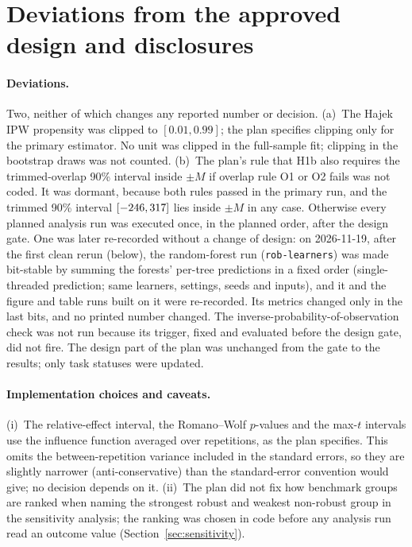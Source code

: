 \documentclass[11pt]{article}
\newcommand{\ci}[2]{$[#1, #2]$}
\begin{document}
\section{Deviations from the approved design and disclosures}
\label{sec:deviations}

\paragraph{Deviations.} Two, neither of which changes any reported number or decision.
(a)~The Hajek IPW propensity was clipped to $[0.01, 0.99]$; the plan specifies clipping only
for the primary estimator. No unit was clipped in the full-sample fit; clipping in the
bootstrap draws was not counted.
(b)~The plan's rule that H1b also requires the trimmed-overlap 90\% interval inside $\pm M$
if overlap rule O1 or O2 fails was not coded. It was dormant, because both rules passed in
the primary run, and the trimmed 90\% interval \ci{\TrimCINinetyLow}{\TrimCINinetyHigh} lies
inside $\pm M$ in any case.
Otherwise every planned analysis run was executed once, in the planned order, after the
design gate. One was later re-recorded without a change of design: on 2026-11-19, after the
first clean rerun (below), the random-forest run (\texttt{rob-learners}) was made bit-stable
by summing the forests' per-tree predictions in a fixed order (single-threaded prediction;
same learners, settings, seeds and inputs), and it and the figure and table runs built on it
were re-recorded. Its metrics changed only in the last bits, and no printed number changed. The inverse-probability-of-observation check
was not run because its trigger, fixed and evaluated before the design gate, did not fire.
The design part of the plan was unchanged from the gate to the results; only task statuses
were updated.

\paragraph{Implementation choices and caveats.} (i)~The relative-effect interval, the
Romano--Wolf $p$-values and the max-$t$ intervals use the influence function averaged over
repetitions, as the plan specifies. This omits the between-repetition variance included in
the standard errors, so they are slightly narrower (anti-conservative) than the
standard-error convention would give; no decision depends on it.
(ii)~The plan did not fix how benchmark groups are ranked when naming the strongest robust
and weakest non-robust group in the sensitivity analysis; the ranking was chosen in code
before any analysis run read an outcome value (Section~\ref{sec:sensitivity}).
\end{document}
